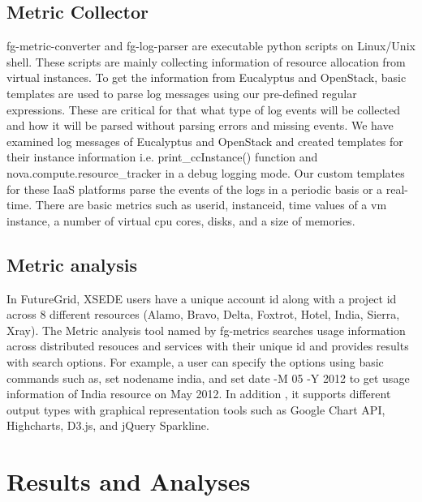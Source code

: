 \documentclass{sig-alternate}
\begin{document}
\subsection{Metric Collector}

fg-metric-converter and fg-log-parser are executable python scripts on Linux/Unix shell. These scripts are mainly collecting information of resource allocation from virtual instances. To get the information from Eucalyptus and OpenStack, basic templates are used to parse log messages using our pre-defined regular expressions. These are critical for that what type of log events will be collected and how it will be parsed without parsing errors and missing events. We have examined log messages of Eucalyptus and OpenStack and created templates for their instance information i.e. print\_ccInstance() function and nova.compute.resource_tracker in a debug logging mode. Our custom templates for these IaaS platforms parse the events of the logs in a periodic basis or a real-time. There are basic metrics such as userid, instanceid, time values of a vm instance, a number of virtual cpu cores, disks, and a size of memories.

\subsection{Metric analysis}

In FutureGrid, XSEDE users have a unique account id along with a project id across 8 different resources (Alamo, Bravo, Delta, Foxtrot, Hotel, India, Sierra, Xray). The Metric analysis tool named by fg-metrics searches usage information across distributed resouces and services with their unique id and provides results with search options. For example, a user can specify the options using basic commands such as, set nodename india, and set date -M 05 -Y 2012 to get usage information of India resource on May 2012. In addition , it supports different output types with graphical representation tools such as Google Chart API, Highcharts, D3.js, and jQuery Sparkline.


\section{Results and Analyses} \label{S:result}
\end{document}
